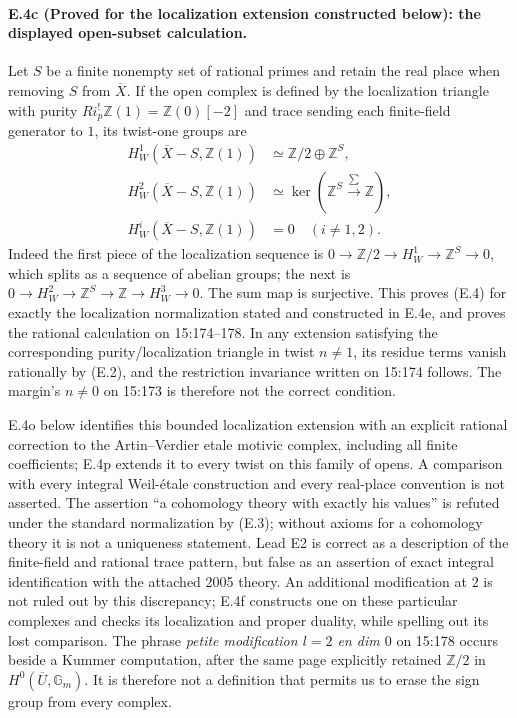 \paragraph{E.4c (Proved for the localization extension constructed below): the displayed open-subset calculation.}
Let $S$ be a finite nonempty set of rational primes and retain the real
place when removing $S$ from $\overline X$. If the open complex is defined
by the localization triangle with purity
$R i_p^!\mathbb Z(1)=\mathbb Z(0)[-2]$ and trace sending each finite-field
generator to $1$, its twist-one groups are
\[
\begin{split}
 H_W^1(\overline X-S,\mathbb Z(1))&\simeq
                \mathbb Z/2\oplus\mathbb Z^S,\\
 H_W^2(\overline X-S,\mathbb Z(1))&\simeq
                \ker(\mathbb Z^S\xrightarrow{\sum}\mathbb Z),\\
 H_W^i(\overline X-S,\mathbb Z(1))&=0\quad(i\ne1,2).
\end{split}
 \tag{E.4}
\]
Indeed the first piece of the localization sequence is
$0\to\mathbb Z/2\to H_W^1\to\mathbb Z^S\to0$, which splits as a
sequence of abelian groups; the next is
$0\to H_W^2\to\mathbb Z^S\to\mathbb Z\to H_W^3\to0$.
The sum map is surjective. This proves (E.4) for exactly
the localization normalization stated and constructed in E.4e, and proves the rational calculation
on 15:174--178. In any extension satisfying the corresponding
purity/localization triangle in twist $n\ne1$, its residue terms vanish
rationally by (E.2), and the restriction invariance written on 15:174 follows.
The margin's $n\ne0$ on 15:173 is therefore not the correct condition.

E.4o below identifies this bounded localization extension with an
explicit rational correction to the Artin--Verdier etale motivic complex,
including all finite coefficients; E.4p extends it to every twist on
this family of opens. A comparison with every integral Weil-\'etale
construction and every real-place convention is not asserted. The assertion ``a cohomology theory with exactly his values''
is refuted under the standard normalization by (E.3); without axioms
for a cohomology theory it is not a uniqueness statement. Lead E2 is
correct as a description of the finite-field and rational trace pattern,
but false as an assertion of exact integral identification with the
attached 2005 theory.
An additional modification at $2$ is not ruled out by this discrepancy;
E.4f constructs one on these particular complexes and checks its
localization and proper duality, while spelling out its lost comparison.
The phrase \textit{petite modification $l=2$ en dim $0$} on 15:178 occurs
beside a Kummer computation, after the same page explicitly retained
$\mathbb Z/2$ in $H^0(\overline U,\mathbb G_m)$. It is therefore not a
definition that permits us to erase the sign group from every complex.

